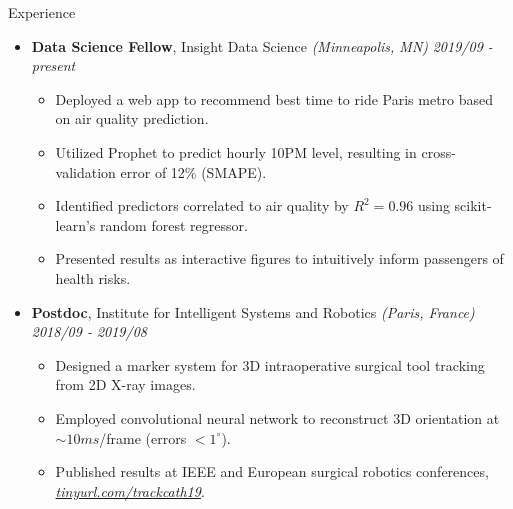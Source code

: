 \documentclass{resume} %
\begin{document}
\begin{rSection}{Experience}
	
	\begin{itemize}
	\item {\bf Data Science Fellow}{, Insight Data Science \textit{(Minneapolis, MN)}} \hfill {\em 2019/09 - present}\\
	\vspace{-5mm}
	\begin{itemize}
		\setlength\itemsep{-1.75em}
		\item Deployed a web app to recommend best time to ride Paris metro based on air quality prediction.\\
		\item Utilized Prophet to predict hourly 10PM level, resulting in cross-validation error of 12\% (SMAPE).\\
		\item Identified predictors correlated to air quality by $R^2 = 0.96$ using scikit-learn's random forest regressor.\\
		\item Presented results as interactive figures to intuitively inform passengers of health risks.
	\end{itemize}	
	
	\item {\bf Postdoc}{, Institute for Intelligent Systems and Robotics \textit{(Paris, France)}} \hfill {\em 2018/09 - 2019/08}\\
	\vspace{-5mm}
	\begin{itemize}
		\setlength\itemsep{-1.75em}
		\item  Designed a marker system for 3D intraoperative surgical tool tracking from 2D X-ray images.\\ 
		\item  Employed convolutional neural network to reconstruct 3D orientation at $\sim 10 ms$/frame (errors $< 1 ^\circ$).\\
		\item  Published results at IEEE and European surgical robotics conferences, \textit{\href{tinyurl.com/trackcath19}{tinyurl.com/trackcath19}}.
	\end{itemize}
	

\end{itemize}
\end{rSection}
\end{document}
